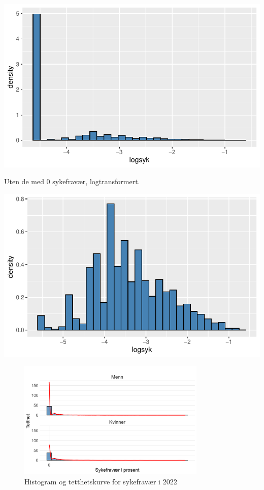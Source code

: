 \documentclass[
  12pt,
  a4paper,
  DIV=11,
  numbers=noendperiod]{scrartcl}
\begin{document}
\includegraphics{kand_SOK2209_Bacheloroppgave_V25_files/figure-pdf/unnamed-chunk-10-1.pdf}

Uten de med 0 sykefravær, logtransformert.

\includegraphics{kand_SOK2209_Bacheloroppgave_V25_files/figure-pdf/unnamed-chunk-11-1.pdf}

\begin{figure}[H]
\caption{Histogram og tetthetskurve for sykefravær i 2022}
\label{fig:histogram}
\centering
\includegraphics[width=0.8\textwidth]{dokumentobjekter/figurer/fig_1.png}
\end{figure}
\end{document}
